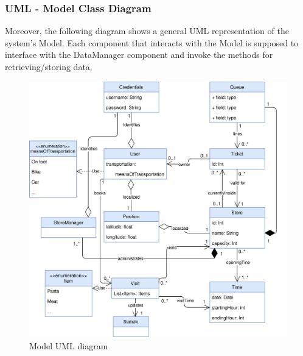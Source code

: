 \documentclass[]{article}
\begin{document}
	\subsubsection{UML - Model Class Diagram}
	Moreover, the following diagram shows a general UML representation of the system's Model. \newline
	Each component that interacts with the Model is supposed to interface with the DataManager component and invoke the methods for retrieving/storing data. \newline
	\bigskip
	\begin{figure}[H]
			\centering
			\includegraphics[scale=0.93]{ComponentView/umlDD.png}
			\caption{Model UML diagram}
			\label{fig:ModelUML}
		\end{figure}
	
		
	
	
	
	\newpage
\end{document}
